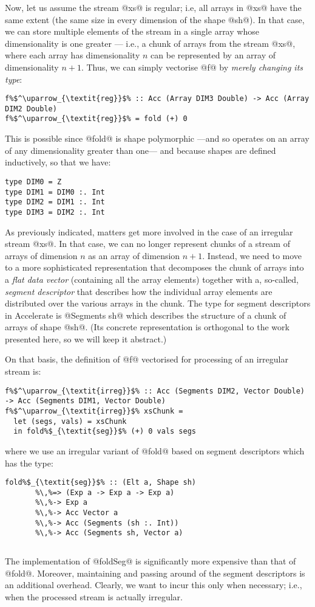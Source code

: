 Now, let us assume the stream @xs@ is regular; i.e, all arrays in @xs@ have the same extent (the same size in every dimension of the shape @sh@). In that case, we can store multiple elements of the stream in a single array whose dimensionality is one greater --- i.e., a chunk of arrays from the stream @xs@, where each array has dimensionality $n$ can be represented by an array of dimensionality $n+1$. Thus, we can simply vectorise @f@ by \emph{merely changing its type}:
%
\begin{lstlisting}
f%$^\uparrow_{\textit{reg}}$% :: Acc (Array DIM3 Double) -> Acc (Array DIM2 Double)
f%$^\uparrow_{\textit{reg}}$% = fold (+) 0
\end{lstlisting}
%
This is possible since @fold@ is shape polymorphic ---and so operates on an
array of any dimensionality greater than one--- and because shapes are defined
inductively, so that we have:
%
\begin{lstlisting}
type DIM0 = Z
type DIM1 = DIM0 :. Int
type DIM2 = DIM1 :. Int
type DIM3 = DIM2 :. Int
\end{lstlisting}

As previously indicated, matters get more involved in the case of an irregular stream @xs@. In that case, we can no longer represent chunks of a stream of arrays of dimension $n$ as an array of dimension $n+1$. Instead, we need to move to a more sophisticated representation that decomposes the chunk of arrays into a \emph{flat data vector} (containing all the array elements) together with a, so-called, \emph{segment descriptor} that describes how the individual array elements are distributed over the various arrays in the chunk. The type for segment descriptors in Accelerate is @Segments sh@ which describes the structure of a chunk of arrays of shape @sh@. (Its concrete representation is orthogonal to the work presented here, so we will keep it abstract.)

On that basis, the definition of @f@ vectorised for processing of an irregular stream is:
%
\begin{lstlisting}
f%$^\uparrow_{\textit{irreg}}$% :: Acc (Segments DIM2, Vector Double) -> Acc (Segments DIM1, Vector Double)
f%$^\uparrow_{\textit{irreg}}$% xsChunk =
  let (segs, vals) = xsChunk
  in fold%$_{\textit{seg}}$% (+) 0 vals segs
\end{lstlisting}
%
where we use an irregular variant of @fold@ based on segment descriptors which has the type:
%
\begin{lstlisting}
fold%$_{\textit{seg}}$% :: (Elt a, Shape sh)
       %\,%=> (Exp a -> Exp a -> Exp a)
       %\,%-> Exp a
       %\,%-> Acc Vector a
       %\,%-> Acc (Segments (sh :. Int))
       %\,%-> Acc (Segments sh, Vector a)
\end{lstlisting}
\begin{lstlisting}
\end{lstlisting}
%
The implementation of @foldSeg@ is significantly more expensive than that of @fold@. Moreover, maintaining and passing around of the segment descriptors is an additional overhead. Clearly, we want to incur this only when necessary; i.e., when the processed stream is actually irregular.

